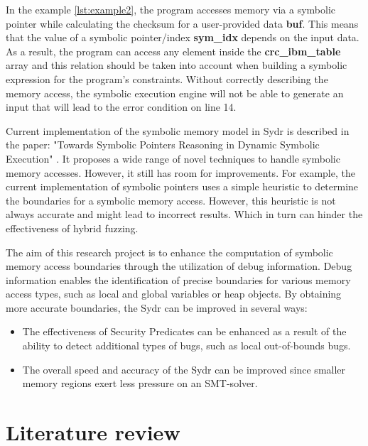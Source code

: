\documentclass[conference]{IEEEtran}
\begin{document}
In the example \ref{lst:example2}, the program accesses memory via a symbolic pointer while calculating the checksum for a user-provided data \textbf{buf}. This means that the value of a symbolic pointer/index \textbf{sym\_idx} depends on the input data. As a result, the program can access any element inside the \textbf{crc\_ibm\_table} array and this relation should be taken into account when building a symbolic expression for the program's constraints. Without correctly describing the memory access, the symbolic execution engine will not be able to generate an input that will lead to the error condition on line 14.

Current implementation of the symbolic memory model in Sydr is described in the paper: "Towards Symbolic Pointers Reasoning in Dynamic Symbolic Execution" \cite{symbolic-pointers-reasoning}. It proposes a wide range of novel techniques to handle symbolic memory accesses. However, it still has room for improvements. For example, the current implementation of symbolic pointers uses a simple heuristic to determine the boundaries for a symbolic memory access. However, this heuristic is not always accurate and might lead to incorrect results. Which in turn can hinder the effectiveness of hybrid fuzzing.

The aim of this research project is to enhance the computation of symbolic memory access boundaries through the utilization of debug information. Debug information enables the identification of precise boundaries for various memory access types, such as local and global variables or heap objects. By obtaining more accurate boundaries, the Sydr can be improved in several ways:

\begin{itemize}
    \item The effectiveness of Security Predicates can be enhanced as a result of the ability to detect additional types of bugs, such as local out-of-bounds bugs.
    \item The overall speed and accuracy of the Sydr can be improved since smaller memory regions exert less pressure on an SMT-solver.
\end{itemize}



\section{Literature review}
\end{document}
